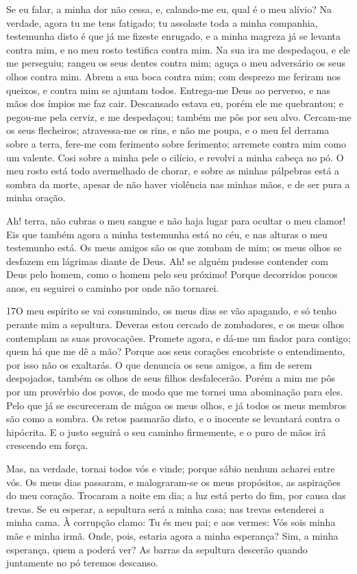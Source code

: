 Se eu falar, a minha dor não cessa, e, calando-me eu, qual é o meu
alívio? Na verdade, agora tu me tens fatigado; tu assolaste toda
a minha companhia, testemunha disto é que já me fizeste
enrugado, e a minha magreza já se levanta contra mim, e no meu rosto
testifica contra mim. Na sua ira me despedaçou, e ele me
perseguiu; rangeu os seus dentes contra mim; aguça o meu adversário
os seus olhos contra mim. Abrem a sua boca contra mim; com
desprezo me feriram nos queixos, e contra mim se ajuntam todos.
Entrega-me Deus ao perverso, e nas mãos dos ímpios me faz
cair. Descansado estava eu, porém ele me quebrantou; e
pegou-me pela cerviz, e me despedaçou; também me pôs por seu alvo.
Cercam-me os seus flecheiros; atravessa-me os rins, e não me
poupa, e o meu fel derrama sobre a terra, fere-me com
ferimento sobre ferimento; arremete contra mim como um valente.
Cosi sobre a minha pele o cilício, e revolvi a minha cabeça
no pó. O meu rosto está todo avermelhado de chorar, e sobre
as minhas pálpebras está a sombra da morte, apesar de não
haver violência nas minhas mãos, e de ser pura a minha oração.

Ah! terra, não cubras o meu sangue e não haja lugar para ocultar
o meu clamor! Eis que também agora a minha testemunha está no
céu, e nas alturas o meu testemunho está. Os meus amigos são
os que zombam de mim; os meus olhos se desfazem em lágrimas diante
de Deus. Ah! se alguém pudesse contender com Deus pelo homem,
como o homem pelo seu próximo! Porque decorridos poucos anos,
eu seguirei o caminho por onde não tornarei.

\medskip

\lettrine{17} O meu espírito se vai consumindo, os meus dias
se vão apagando, e só tenho perante mim a sepultura. Deveras
estou cercado de zombadores, e os meus olhos contemplam as suas
provocações. Promete agora, e dá-me um fiador para contigo; quem
há que me dê a mão? Porque aos seus corações encobriste o
entendimento, por isso não os exaltarás. O que denuncia os seus
amigos, a fim de serem despojados, também os olhos de seus filhos
desfalecerão. Porém a mim me pôs por um provérbio dos povos, de
modo que me tornei uma abominação para eles. Pelo que já se
escureceram de mágoa os meus olhos, e já todos os meus membros são
como a sombra. Os retos pasmarão disto, e o inocente se
levantará contra o hipócrita. E o justo seguirá o seu caminho
firmemente, e o puro de mãos irá crescendo em força.

Mas, na verdade, tornai todos vós e vinde; porque sábio nenhum
acharei entre vós. Os meus dias passaram, e malograram-se os
meus propósitos, as aspirações do meu coração. Trocaram a
noite em dia; a luz está perto do fim, por causa das trevas.
Se eu esperar, a sepultura será a minha casa; nas trevas
estenderei a minha cama. À corrupção clamo: Tu és meu pai; e
aos vermes: Vós sois minha mãe e minha irmã. Onde, pois,
estaria agora a minha esperança? Sim, a minha esperança, quem a
poderá ver? As barras da sepultura descerão quando juntamente
no pó teremos descanso.

